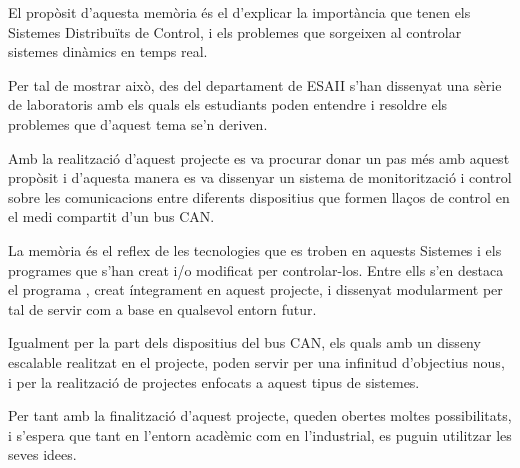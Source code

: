 


\begin{abstracts}        %

El propòsit d'aquesta memòria és el d'explicar la importància que tenen els Sistemes Distribuïts de Control, i els problemes que sorgeixen al controlar sistemes dinàmics en temps real.

Per tal de mostrar això, des del departament de ESAII s'han dissenyat una sèrie de laboratoris amb els quals els estudiants poden entendre i resoldre els problemes que d'aquest tema se'n deriven.

Amb la realització d'aquest projecte es va procurar donar un pas més amb aquest propòsit i d'aquesta manera es va dissenyar un sistema de monitorització i control sobre les comunicacions entre diferents dispositius que formen llaços de control en el medi compartit d'un bus CAN.

La memòria és el reflex de les tecnologies que es troben en aquests Sistemes i els programes que s'han creat i/o modificat per controlar-los. Entre ells s'en destaca el programa \DCSMonitor, creat íntegrament en aquest projecte, i dissenyat modularment per tal de servir com a base en qualsevol entorn futur.

Igualment per la part dels dispositius del bus CAN, els quals amb un disseny escalable realitzat en el projecte, poden servir per una infinitud d'objectius nous, i per la realització de projectes enfocats a aquest tipus de sistemes.

Per tant amb la finalització d'aquest projecte, queden obertes moltes possibilitats, i s'espera que tant en l'entorn acadèmic com en l'industrial, es puguin utilitzar les seves idees.

\end{abstracts}


